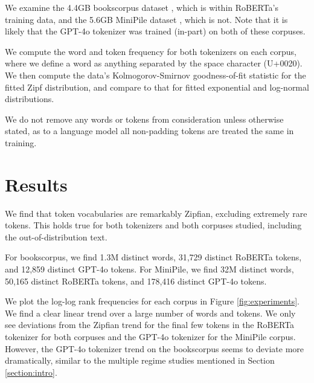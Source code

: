 \documentclass[11pt]{article}
\begin{document}
We examine the 4.4GB bookscorpus dataset \cite{zhu2015aligningbooksmoviesstorylike}, which is within RoBERTa's training data, and the 5.6GB MiniPile dataset \cite{kaddour2023minipilechallengedataefficientlanguage}, which is not. Note that it is likely that the GPT-4o tokenizer was trained (in-part) on both of these corpuses.

We compute the word and token frequency for both tokenizers on each corpus, where we define a word as anything separated by the space character (U+0020). We then compute the data's Kolmogorov-Smirnov goodness-of-fit statistic for the fitted Zipf distribution, and compare to that for fitted exponential and log-normal distributions. 

We do not remove any words or tokens from consideration unless otherwise stated, as to a language model all non-padding tokens are treated the same in training. 

\section{Results}

We find that token vocabularies are remarkably Zipfian, excluding extremely rare tokens. This holds true for both tokenizers and both corpuses studied, including the out-of-distribution text. 

For bookscorpus, we find 1.3M distinct words, 31,729 distinct RoBERTa tokens, and 12,859 distinct GPT-4o tokens. For MiniPile, we find 32M distinct words, 50,165 distinct RoBERTa tokens, and 178,416 distinct GPT-4o tokens. 

We plot the log-log rank frequencies for each corpus in Figure \ref{fig:experiments}. We find a clear linear trend over a large number of words and tokens. We only see deviations from the Zipfian trend for the final few tokens in the RoBERTa tokenizer for both corpuses and the GPT-4o tokenizer for the MiniPile corpus. However, the GPT-4o tokenizer trend on the bookscorpus seems to deviate more dramatically, similar to the multiple regime studies mentioned in Section \ref{section:intro}.
\end{document}
